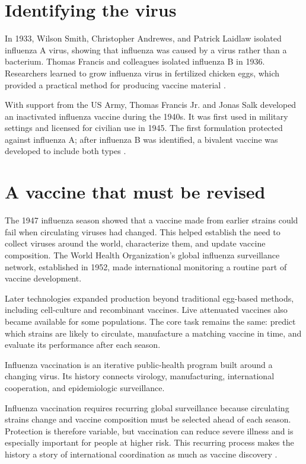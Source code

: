 \documentclass[12pt,oneside]{book}
\begin{document}
\section{Identifying the virus}
In 1933, Wilson Smith, Christopher Andrewes, and Patrick Laidlaw isolated influenza A virus, showing that influenza was caused by a virus rather than a bacterium. Thomas Francis and colleagues isolated influenza B in 1936. Researchers learned to grow influenza virus in fertilized chicken eggs, which provided a practical method for producing vaccine material \cite{cdcInfluenzaTimeline}.

With support from the US Army, Thomas Francis Jr. and Jonas Salk developed an
inactivated influenza vaccine during the 1940s. It was first used in military
settings and licensed for civilian use in 1945. The first formulation
protected against influenza A; after influenza B was identified, a bivalent
vaccine was developed to include both types \cite{cdcInfluenzaTimeline}.

\section{A vaccine that must be revised}
The 1947 influenza season showed that a vaccine made from earlier strains could fail when circulating viruses had changed. This helped establish the need to collect viruses around the world, characterize them, and update vaccine composition. The World Health Organization's global influenza surveillance network, established in 1952, made international monitoring a routine part of vaccine development.

Later technologies expanded production beyond traditional egg-based methods,
including cell-culture and recombinant vaccines. Live attenuated vaccines also
became available for some populations. The core task remains the same: predict
which strains are likely to circulate, manufacture a matching vaccine in time,
and evaluate its performance after each season.

Influenza vaccination is an iterative public-health program built around a
changing virus. Its history connects virology, manufacturing, international
cooperation, and epidemiologic surveillance.

Influenza vaccination requires recurring global surveillance because
circulating strains change and vaccine composition must be selected ahead of
each season. Protection is therefore variable, but vaccination can reduce
severe illness and is especially important for people at higher risk. This
recurring process makes the history a story of international coordination as
much as vaccine discovery \cite{cdcInfluenzaTimeline}.
\end{document}
